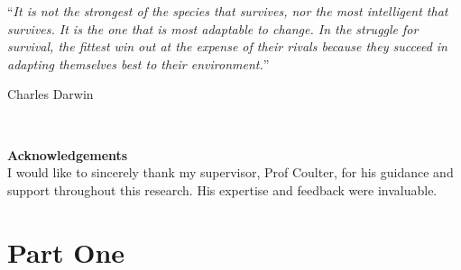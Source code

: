 \documentclass[
	12pt, %
	fleqn, %
	a4paper, %
]{LegrandOrangeBook}
\begin{document}

\thispagestyle{empty} %

\noindent\enquote{\itshape It is not the strongest of the species that survives, nor the most intelligent that survives. It is the one that is most adaptable to change. In the struggle for survival, the fittest win out at the expense of their rivals because they succeed in adapting themselves best to their environment.}\bigbreak

\hfill Charles Darwin


~\vfill %

\noindent \textbf{Acknowledgements} \\
I would like to sincerely thank my supervisor, Prof Coulter, for his guidance and support throughout this research. His expertise and feedback were invaluable. 



\pagestyle{empty} %

\tableofcontents %

\listoffigures %

\listoftables %

\pagestyle{fancy} %

\cleardoublepage %


\part{Part One}

\chapterimage{} %
\chapterspaceabove{6.75cm} %
\chapterspacebelow{7.25cm} %
\end{document}

